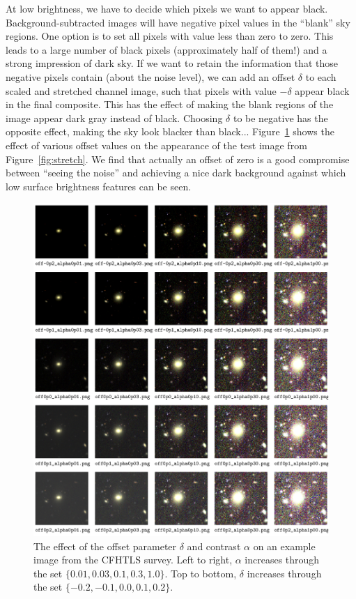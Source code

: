 \documentclass[letterpaper, 11pt]{article}
\begin{document}
At low brightness, we have to decide which pixels we want to appear black.
Background-subtracted images will have negative pixel values in the ``blank''
sky regions. One option is to set all pixels with value less than zero to
zero. This leads to a large number of black pixels (approximately half of
them!) and a strong impression of dark sky. If we want to retain the
information that those negative pixels contain (about the noise level), we can
add an offset $\delta$ to each scaled and stretched channel image, such that
pixels with value $-\delta$ appear black in the final composite. This has the
effect of making the blank regions of the image appear dark gray instead of
black. Choosing $\delta$ to be negative has the opposite effect, making the
sky look blacker than black... Figure~\ref{fig:offset} shows the effect of
various offset values on the appearance of the test image from
Figure~\ref{fig:stretch}. We find that actually an offset of zero is a good
compromise between ``seeing the noise'' and achieving a nice dark background
against which low surface brightness features can be seen.

\begin{figure}
\centering\includegraphics[width=0.9\linewidth]{Images/CFHTLS_27_offset-alpha_gallery.png}
\caption{The effect of the offset parameter $\delta$ and contrast 
$\alpha$ on an
example image from the CFHTLS survey. Left to right, $\alpha$ increases
through the set $\{0.01,0.03,0.1,0.3,1.0\}$. Top to bottom, $\delta$ increases
through the set $\{-0.2,-0.1,0.0,0.1,0.2\}$.}
\label{fig:offset}
\end{figure}
\end{document}
